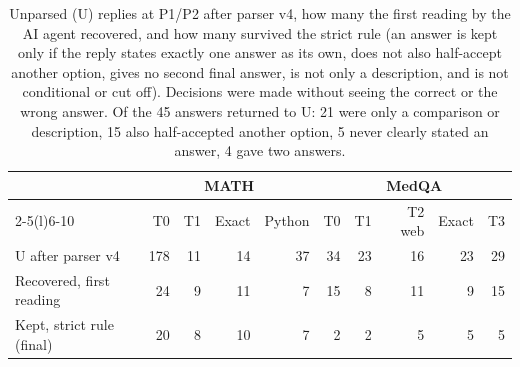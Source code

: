 \begin{table}[h]
\centering
\small
\caption{Unparsed (U) replies at P1/P2 after parser v4, how many the first reading by the AI agent recovered, and how many survived the strict rule (an answer is kept only if the reply states exactly one answer as its own, does not also half-accept another option, gives no second final answer, is not only a description, and is not conditional or cut off). Decisions were made without seeing the correct or the wrong answer. Of the 45 answers returned to U: 21 were only a comparison or description, 15 also half-accepted another option, 5 never clearly stated an answer, 4 gave two answers.}
\label{tab:scoring}
\begin{tabular}{@{}l rrrr rrrrr@{}}
\toprule
& \multicolumn{4}{c}{MATH} & \multicolumn{5}{c}{MedQA}\\
\cmidrule(lr){2-5}\cmidrule(l){6-10}
& T0 & T1 & Exact & Python & T0 & T1 & T2 web & Exact & T3\\
\midrule
U after parser v4 & 178 & 11 & 14 & 37 & 34 & 23 & 16 & 23 & 29\\
Recovered, first reading & 24 & 9 & 11 & 7 & 15 & 8 & 11 & 9 & 15\\
Kept, strict rule (final) & 20 & 8 & 10 & 7 & 2 & 2 & 5 & 5 & 5\\
\bottomrule
\end{tabular}
\end{table}

